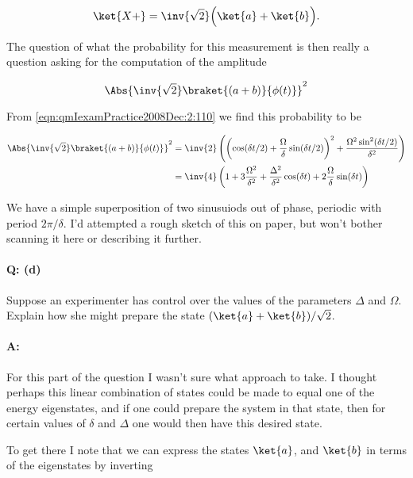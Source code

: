 \begin{equation}\label{eqn:qmIexamPractice2008Dec:2:120}
\ket{X+} = \inv{\sqrt{2}} \Bigl( \ket{a} + \ket{b} \Bigr).
\end{equation}

The question of what the probability for this measurement is then really a question asking for the computation of the amplitude

\begin{equation}\label{eqn:qmIexamPractice2008Dec:2:130}
\Abs{
\inv{\sqrt{2}}
\braket{
 (a + b)}{\phi(t)}}^2
\end{equation}

From \ref{eqn:qmIexamPractice2008Dec:2:110} we find this probability to be

\begin{align*}
\Abs{
\inv{\sqrt{2}}
\braket{
 (a + b)}{\phi(t)}}^2
&=
\inv{2} \left(
\left(\cos(\delta t/2) + \frac{\Omega}{\delta} \sin(\delta t/2)\right)^2
+ \frac{ \Omega^2 \sin^2(\delta t/2)}{\delta^2}
\right) \\
&=
\inv{4} \left( 1 + 3 \frac{\Omega^2}{\delta^2} + \frac{\Delta^2}{\delta^2} \cos (\delta t) + 2 \frac{ \Omega}{\delta} \sin(\delta t) \right)
\end{align*}

We have a simple superposition of two sinusuiods out of phase, periodic with period $2 \pi/\delta$.  I'd attempted a rough sketch of this on paper, but won't bother scanning it here or describing it further.

\paragraph{Q: (d)}

Suppose an experimenter has control over the values of the parameters $\Delta$ and $\Omega$.  Explain how she might prepare the state $(\ket{a} + \ket{b})/\sqrt{2}$.

\paragraph{A:}

For this part of the question I wasn't sure what approach to take.  I thought perhaps this linear combination of states could be made to equal one of the energy eigenstates, and if one could prepare the system in that state, then for certain values of $\delta$ and $\Delta$ one would then have this desired state.

To get there I note that we can express the states $\ket{a}$, and $\ket{b}$ in terms of the eigenstates by inverting

